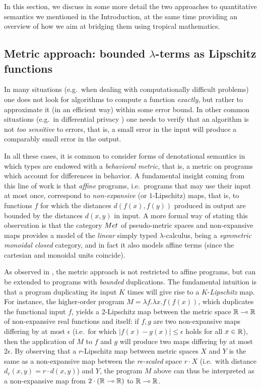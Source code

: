 

In this section, we discuss in some more detail the two approaches to quantitative semantics we mentioned in the Introduction, at the same time providing an overview of how we aim at bridging them using tropical mathematics.

\subsection{Metric approach: bounded $\lambda$-terms as Lipschitz functions}


In many situations (e.g.~when dealing with computationally difficult problems) one does not look for algorithms to compute a function \emph{exactly}, but rather to approximate it (in an efficient way) within some error bound. In other common situations (e.g.~in differential privacy \cite{Alvim2011, Reed2010}) one needs to verify that an algorithm is not \emph{too sensitive} to errors, that is, a small error in the input will produce a comparably small error in the output. 

In all these cases, it is common to consider forms of denotational semantics in which types are endowed with a \emph{behavioral metric}, that is, a metric on programs which account for differences in behavior. 
A fundamental insight coming from this line of work is that \emph{affine} programs, i.e.~programs that may use their input at most once, correspond to \emph{non-expansive} (or $1$-Lipschitz) maps, that is, to functions $f$ for which the distances
$d(f(x),f(y))$ produced in output are bounded by the distances $d(x,y)$ in input. 
A more formal way of stating this observation is that the category $\Met$ of pseudo-metric spaces and non-expansive maps provides a model of the \emph{linear} simply typed $\lambda$-calculus, being a \emph{symmetric monoidal closed} category, and in fact it also models {affine} terms (since the cartesian and monoidal units coincide). 

As observed in \cite{Reed2010, Gaboardi2017}, the metric approach is not restricted to affine programs, but can be extended to programs with \emph{bounded} duplications. The fundamental intuition is that a program duplicating its input $K$ times will give rise to a $K$-\emph{Lipschitz} map.
For instance, the higher-order program $M=\lambda f.\lambda x.f(f(x))$, which duplicates the functional input $f$, yields a $2$-Lipschitz map between the metric space $\mathbb{R}\multimap \mathbb{R}$ of non-expansive real functions and itself: if $f,g$ are two non-expansive maps differing by at most $\epsilon$ (i.e.~for which $|f(x)-g(x)|\leq \epsilon$ holds for all $x\in \mathbb{R}$), then the application of $M$ to $f$ and $g$ will produce two maps differing by at most $2\epsilon$. 
By observing that a $r$-Lipschitz map between metric spaces $X$ and $Y$ is the same as a non-expansive map between the \emph{re-scaled} space $r\cdot X$ (i.e.~with distance $d_{r}(x,y)=r\cdot d(x,y)$) and $Y$, the program $M$ above 
can thus be interpreted as a non-expansive map from $2\cdot(\mathbb{R}\multimap \mathbb{R})$ to $\mathbb{R}\multimap \mathbb{R}$.

